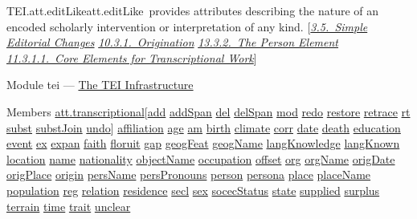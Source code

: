\begin{reflist}
\item[]\begin{specHead}{TEI.att.editLike}{att.editLike} provides attributes describing the nature of an encoded scholarly intervention or interpretation of any kind. [\textit{\hyperref[COED]{3.5.\ Simple Editorial Changes}} \textit{\hyperref[msdates]{10.3.1.\ Origination}} \textit{\hyperref[NDPERSE]{13.3.2.\ The Person Element}} \textit{\hyperref[PHCO]{11.3.1.1.\ Core Elements for Transcriptional Work}}]\end{specHead} 
    \item[{Module}]
  tei — \hyperref[ST]{The TEI Infrastructure}
    \item[{Members}]
  \hyperref[TEI.att.transcriptional]{att.transcriptional}[\hyperref[TEI.add]{add} \hyperref[TEI.addSpan]{addSpan} \hyperref[TEI.del]{del} \hyperref[TEI.delSpan]{delSpan} \hyperref[TEI.mod]{mod} \hyperref[TEI.redo]{redo} \hyperref[TEI.restore]{restore} \hyperref[TEI.retrace]{retrace} \hyperref[TEI.rt]{rt} \hyperref[TEI.subst]{subst} \hyperref[TEI.substJoin]{substJoin} \hyperref[TEI.undo]{undo}] \hyperref[TEI.affiliation]{affiliation} \hyperref[TEI.age]{age} \hyperref[TEI.am]{am} \hyperref[TEI.birth]{birth} \hyperref[TEI.climate]{climate} \hyperref[TEI.corr]{corr} \hyperref[TEI.date]{date} \hyperref[TEI.death]{death} \hyperref[TEI.education]{education} \hyperref[TEI.event]{event} \hyperref[TEI.ex]{ex} \hyperref[TEI.expan]{expan} \hyperref[TEI.faith]{faith} \hyperref[TEI.floruit]{floruit} \hyperref[TEI.gap]{gap} \hyperref[TEI.geogFeat]{geogFeat} \hyperref[TEI.geogName]{geogName} \hyperref[TEI.langKnowledge]{langKnowledge} \hyperref[TEI.langKnown]{langKnown} \hyperref[TEI.location]{location} \hyperref[TEI.name]{name} \hyperref[TEI.nationality]{nationality} \hyperref[TEI.objectName]{objectName} \hyperref[TEI.occupation]{occupation} \hyperref[TEI.offset]{offset} \hyperref[TEI.org]{org} \hyperref[TEI.orgName]{orgName} \hyperref[TEI.origDate]{origDate} \hyperref[TEI.origPlace]{origPlace} \hyperref[TEI.origin]{origin} \hyperref[TEI.persName]{persName} \hyperref[TEI.persPronouns]{persPronouns} \hyperref[TEI.person]{person} \hyperref[TEI.persona]{persona} \hyperref[TEI.place]{place} \hyperref[TEI.placeName]{placeName} \hyperref[TEI.population]{population} \hyperref[TEI.reg]{reg} \hyperref[TEI.relation]{relation} \hyperref[TEI.residence]{residence} \hyperref[TEI.secl]{secl} \hyperref[TEI.sex]{sex} \hyperref[TEI.socecStatus]{socecStatus} \hyperref[TEI.state]{state} \hyperref[TEI.supplied]{supplied} \hyperref[TEI.surplus]{surplus} \hyperref[TEI.terrain]{terrain} \hyperref[TEI.time]{time} \hyperref[TEI.trait]{trait} \hyperref[TEI.unclear]{unclear}

\end{reflist}
